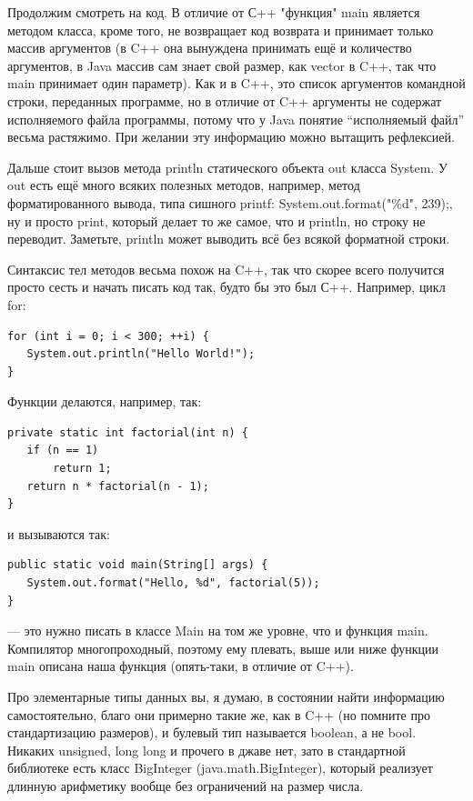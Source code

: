 \documentclass[a5paper]{article}
\begin{document}
Продолжим смотреть на код. В отличие от С++ "функция" main является методом класса, кроме того, не возвращает код возврата и принимает только массив аргументов (в C++ она вынуждена принимать ещё и количество аргументов, в Java массив сам знает свой размер, как vector в C++, так что main принимает один параметр). Как и в C++,  это список аргументов командной строки, переданных программе, но в отличие от C++ аргументы не содержат исполняемого файла программы, потому что у Java понятие ``исполняемый файл'' весьма растяжимо. При желании эту информацию можно вытащить рефлексией.

Дальше стоит вызов метода println статического объекта out класса System. У out есть ещё много всяких полезных методов, например, метод форматированного вывода, типа сишного printf: System.out.format("\%d", 239);, ну и просто print, который делает то же самое, что и println, но строку не переводит. Заметьте, println может выводить всё без всякой форматной строки.

Синтаксис тел методов весьма похож на C++, так что скорее всего получится просто сесть и начать писать код так, будто бы это был С++. Например, цикл for:

\begin{verbatim}
for (int i = 0; i < 300; ++i) {
   System.out.println("Hello World!");
}
\end{verbatim}

Функции делаются, например, так:

\begin{verbatim}
private static int factorial(int n) {
   if (n == 1)
       return 1;
   return n * factorial(n - 1);
}
\end{verbatim}

и вызываются так:

\begin{verbatim}
public static void main(String[] args) {
   System.out.format("Hello, %d", factorial(5));
}
\end{verbatim}

--- это нужно писать в классе Main на том же уровне, что и функция main. Компилятор многопроходный, поэтому ему плевать, выше или ниже функции main описана наша функция (опять-таки, в отличие от C++).

Про элементарные типы данных вы, я думаю, в состоянии найти информацию самостоятельно, благо они примерно такие же, как в C++ (но помните про стандартизацию размеров), и булевый тип называется boolean, а не bool. Никаких unsigned, long long и прочего в джаве нет, зато в стандартной библиотеке есть класс BigInteger (java.math.BigInteger), который реализует длинную арифметику вообще без ограничений на размер числа.
\end{document}
